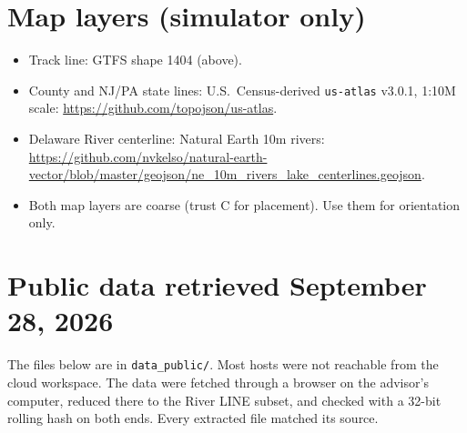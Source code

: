 \documentclass[11pt]{article}
\begin{document}
\section{Map layers (simulator only)}
\begin{itemize}
\item Track line: GTFS shape 1404 (above).
\item County and NJ/PA state lines: U.S.\ Census-derived \texttt{us-atlas} v3.0.1, 1:10M scale: \url{https://github.com/topojson/us-atlas}.
\item Delaware River centerline: Natural Earth 10m rivers: \url{https://github.com/nvkelso/natural-earth-vector/blob/master/geojson/ne_10m_rivers_lake_centerlines.geojson}.
\item Both map layers are coarse (trust C for placement). Use them for orientation only.
\end{itemize}


\section{Public data retrieved September 28, 2026}\label{sec:pull}
The files below are in \nolinkurl{data_public/}. Most hosts were not reachable from the cloud workspace. The data were fetched through a browser on the advisor's computer, reduced there to the River LINE subset, and checked with a 32-bit rolling hash on both ends. Every extracted file matched its source.
\end{document}
